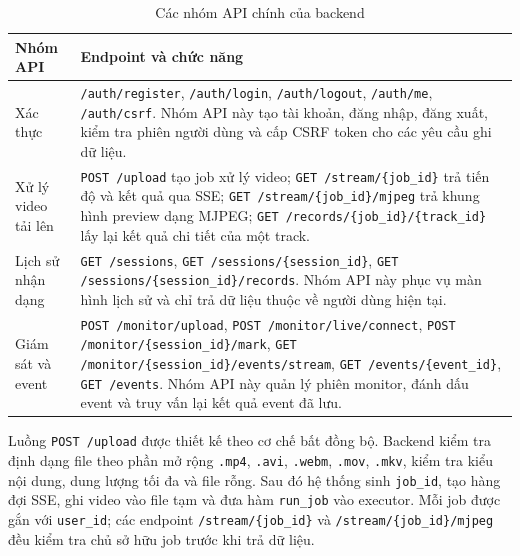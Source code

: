 \documentclass[../DoAn.tex]{subfiles}
\begin{document}
\begin{table}[htbp]
\centering
\renewcommand{\arraystretch}{1.15}
\begin{tabular}{|p{3.6cm}|p{9.8cm}|}
\hline
\textbf{Nhóm API} & \textbf{Endpoint và chức năng} \\ \hline
Xác thực & \texttt{/auth/register}, \texttt{/auth/login}, \texttt{/auth/logout}, \texttt{/auth/me}, \texttt{/auth/csrf}. Nhóm API này tạo tài khoản, đăng nhập, đăng xuất, kiểm tra phiên người dùng và cấp CSRF token cho các yêu cầu ghi dữ liệu. \\ \hline
Xử lý video tải lên & \texttt{POST /upload} tạo job xử lý video; \newline \texttt{GET /stream/\{job\_id\}} trả tiến độ và kết quả qua SSE; \newline \texttt{GET /stream/\{job\_id\}/mjpeg} trả khung hình preview dạng MJPEG; \newline \texttt{GET /records/\{job\_id\}/\{track\_id\}} lấy lại kết quả chi tiết của một track. \\ \hline
Lịch sử nhận dạng & \texttt{GET /sessions}, \texttt{GET /sessions/\{session\_id\}}, \texttt{GET /sessions/\{session\_id\}/records}. Nhóm API này phục vụ màn hình lịch sử và chỉ trả dữ liệu thuộc về người dùng hiện tại. \\ \hline
Giám sát và event & \texttt{POST /monitor/upload}, \texttt{POST /monitor/live/connect}, \newline \texttt{POST /monitor/\{session\_id\}/mark}, \newline \texttt{GET /monitor/\{session\_id\}/events/stream}, \newline \texttt{GET /events/\{event\_id\}}, \texttt{GET /events}. Nhóm API này quản lý phiên monitor, đánh dấu event và truy vấn lại kết quả event đã lưu. \\ \hline
\end{tabular}
\caption{Các nhóm API chính của backend}
\label{table:backend_api_groups}
\end{table}

Luồng \texttt{POST /upload} được thiết kế theo cơ chế bất đồng bộ. Backend kiểm tra định dạng file theo phần mở rộng \texttt{.mp4}, \texttt{.avi}, \texttt{.webm}, \texttt{.mov}, \texttt{.mkv}, kiểm tra kiểu nội dung, dung lượng tối đa và file rỗng. Sau đó hệ thống sinh \texttt{job\_id}, tạo hàng đợi SSE, ghi video vào file tạm và đưa hàm \texttt{run\_job} vào executor. Mỗi job được gắn với \texttt{user\_id}; các endpoint \texttt{/stream/\{job\_id\}} và \texttt{/stream/\{job\_id\}/mjpeg} đều kiểm tra chủ sở hữu job trước khi trả dữ liệu.
\end{document}
